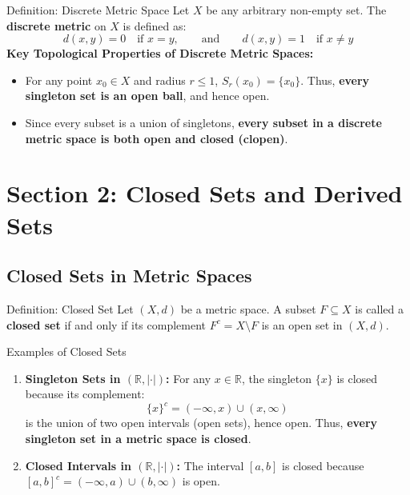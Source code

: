 \documentclass[11pt,a4paper]{article}
\begin{document}
\begin{defbox}{Definition: Discrete Metric Space}
Let $X$ be any arbitrary non-empty set. The \textbf{discrete metric} on $X$ is defined as:
\begin{equation}
    d(x, y) = 0 \quad \text{if } x = y, \qquad \text{and} \qquad d(x, y) = 1 \quad \text{if } x \neq y
\end{equation}
\textbf{Key Topological Properties of Discrete Metric Spaces:}
\begin{itemize}
    \item For any point $x_0 \in X$ and radius $r \le 1$, $S_r(x_0) = \{x_0\}$. Thus, \textbf{every singleton set is an open ball}, and hence open.
    \item Since every subset is a union of singletons, \textbf{every subset in a discrete metric space is both open and closed (clopen)}.
\end{itemize}
\end{defbox}

\newpage

\section{Section 2: Closed Sets and Derived Sets}

\subsection{Closed Sets in Metric Spaces}

\begin{defbox}{Definition: Closed Set}
Let $(X, d)$ be a metric space. A subset $F \subseteq X$ is called a \textbf{closed set} if and only if its complement $F^c = X \setminus F$ is an open set in $(X, d)$.
\end{defbox}

\begin{exbox}{Examples of Closed Sets}
\begin{enumerate}
    \item \textbf{Singleton Sets in $(\mathbb{R}, |\cdot|)$:}
    For any $x \in \mathbb{R}$, the singleton $\{x\}$ is closed because its complement:
    $$\{x\}^c = (-\infty, x) \cup (x, \infty)$$
    is the union of two open intervals (open sets), hence open. Thus, \textbf{every singleton set in a metric space is closed}.
    
    \item \textbf{Closed Intervals in $(\mathbb{R}, |\cdot|)$:}
    The interval $[a, b]$ is closed because $[a, b]^c = (-\infty, a) \cup (b, \infty)$ is open.
\end{enumerate}
\end{exbox}
\end{document}
